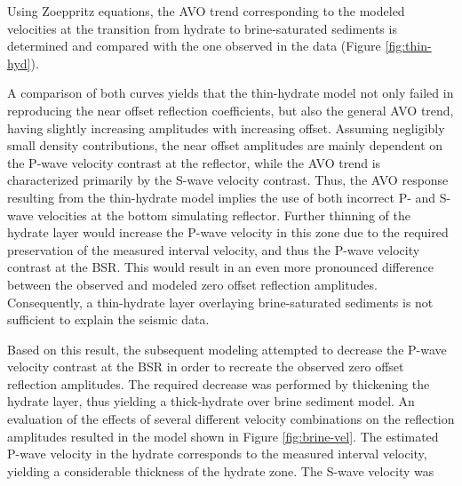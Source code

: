 \notinteractive
{}

Using Zoeppritz equations, the AVO trend corresponding to the modeled 
velocities at the transition from hydrate to brine-saturated sediments is 
determined and compared with the one observed in the data 
(Figure \ref{fig:thin-hyd}).


A comparison of both curves yields that the thin-hydrate model not only failed
in reproducing the near offset reflection coefficients, but also the general 
AVO trend, having slightly increasing amplitudes with increasing offset.
Assuming negligibly small density contributions, the near offset amplitudes
are mainly dependent on the P-wave velocity contrast at the reflector, 
while the AVO trend is 
characterized primarily by the S-wave velocity contrast.
Thus, the AVO response resulting from the thin-hydrate model implies the use
of both incorrect P- and S-wave velocities at the bottom simulating reflector.
Further thinning of the hydrate layer would increase the P-wave
velocity in this zone due to the required preservation of the measured 
interval velocity, and thus the P-wave velocity contrast at the BSR.
This would result in an even more pronounced difference between the observed 
and modeled zero offset reflection amplitudes. Consequently, a thin-hydrate
layer overlaying brine-saturated sediments is not sufficient to explain
the seismic data.
\par
Based on this result, the subsequent modeling attempted to decrease the 
P-wave velocity contrast at the BSR in order to recreate the observed zero 
offset reflection amplitudes. The required decrease was performed by thickening
the hydrate layer, thus yielding a thick-hydrate over brine sediment model. 
An evaluation of the effects of several different velocity combinations on
the reflection amplitudes resulted in the model shown in Figure \ref{fig:brine-vel}.
The estimated P-wave velocity in the hydrate 
corresponds to the measured interval velocity,
yielding a considerable thickness of the hydrate zone. The S-wave velocity was
